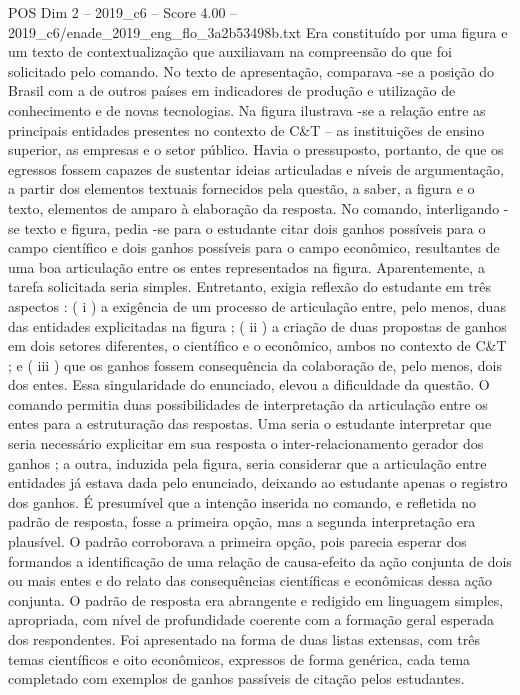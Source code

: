 \begin{textsample}{POS Dim 2 – 2019\_c6 – Score 4.00 – 2019\_c6/enade\_2019\_eng\_flo\_3a2b53498b.txt}
Era constituído por uma figura e um texto de contextualização que auxiliavam na compreensão do que foi solicitado pelo comando.
No texto de apresentação, comparava -se a posição do Brasil com a de outros países em indicadores de produção e utilização de conhecimento e de novas tecnologias.
Na figura ilustrava -se a relação entre as principais entidades presentes no contexto de C\&T – as instituições de ensino superior, as empresas e o setor público.
Havia o pressuposto, portanto, de que os egressos fossem capazes de sustentar ideias articuladas e níveis de argumentação, a partir dos elementos textuais fornecidos pela questão, a saber, a figura e o texto, elementos de amparo à elaboração da resposta.
No comando, interligando -se texto e figura, pedia -se para o estudante citar dois ganhos possíveis para o campo científico e dois ganhos possíveis para o campo econômico, resultantes de uma boa articulação entre os entes representados na figura.
Aparentemente, a tarefa solicitada seria simples.
Entretanto, exigia reflexão do estudante em três aspectos : ( i ) a exigência de um processo de articulação entre, pelo menos, duas das entidades explicitadas na figura ; ( ii ) a criação de duas propostas de ganhos em dois setores diferentes, o científico e o econômico, ambos no contexto de C\&T ; e ( iii ) que os ganhos fossem consequência da colaboração de, pelo menos, dois dos entes.
Essa singularidade do enunciado, elevou a dificuldade da questão.
O comando permitia duas possibilidades de interpretação da articulação entre os entes para a estruturação das respostas.
Uma seria o estudante interpretar que seria necessário explicitar em sua resposta o inter-relacionamento gerador dos ganhos ; a outra, induzida pela figura, seria considerar que a articulação entre entidades já estava dada pelo enunciado, deixando ao estudante apenas o registro dos ganhos.
É presumível que a intenção inserida no comando, e refletida no padrão de resposta, fosse a primeira opção, mas a segunda interpretação era plausível.
O padrão corroborava a primeira opção, pois parecia esperar dos formandos a identificação de uma relação de causa-efeito da ação conjunta de dois ou mais entes e do relato das consequências científicas e econômicas dessa ação conjunta.
O padrão de resposta era abrangente e redigido em linguagem simples, apropriada, com nível de profundidade coerente com a formação geral esperada dos respondentes.
Foi apresentado na forma de duas listas extensas, com três temas científicos e oito econômicos, expressos de forma genérica, cada tema completado com exemplos de ganhos passíveis de citação pelos estudantes.

\end{textsample}
